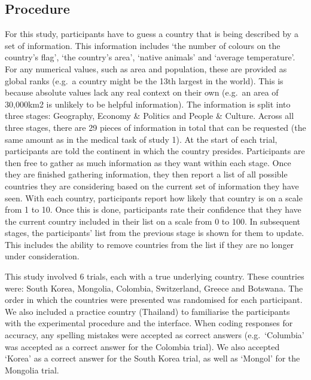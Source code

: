 \documentclass[a4paper, nobind]{templates/ociamthesis}
\begin{document}
\hypertarget{procedure-1}{%
\subsection*{Procedure}\label{procedure-1}}

For this study, participants have to guess a country that is being described by a set of information. This information includes `the number of colours on the country's flag', `the country's area', `native animals' and `average temperature'. For any numerical values, such as area and population, these are provided as global ranks (e.g.~a country might be the 13th largest in the world). This is because absolute values lack any real context on their own (e.g.~an area of 30,000km2 is unlikely to be helpful information). The information is split into three stages: Geography, Economy \& Politics and People \& Culture. Across all three stages, there are 29 pieces of information in total that can be requested (the same amount as in the medical task of study 1). At the start of each trial, participants are told the continent in which the country presides. Participants are then free to gather as much information as they want within each stage. Once they are finished gathering information, they then report a list of all possible countries they are considering based on the current set of information they have seen. With each country, participants report how likely that country is on a scale from 1 to 10. Once this is done, participants rate their confidence that they have the current country included in their list on a scale from 0 to 100. In subsequent stages, the participants' list from the previous stage is shown for them to update. This includes the ability to remove countries from the list if they are no longer under consideration.

This study involved 6 trials, each with a true underlying country. These countries were: South Korea, Mongolia, Colombia, Switzerland, Greece and Botswana. The order in which the countries were presented was randomised for each participant. We also included a practice country (Thailand) to familiarise the participants with the experimental procedure and the interface. When coding responses for accuracy, any spelling mistakes were accepted as correct answers (e.g.~`Columbia' was accepted as a correct answer for the Colombia trial). We also accepted `Korea' as a correct answer for the South Korea trial, as well as `Mongol' for the Mongolia trial.
\end{document}
